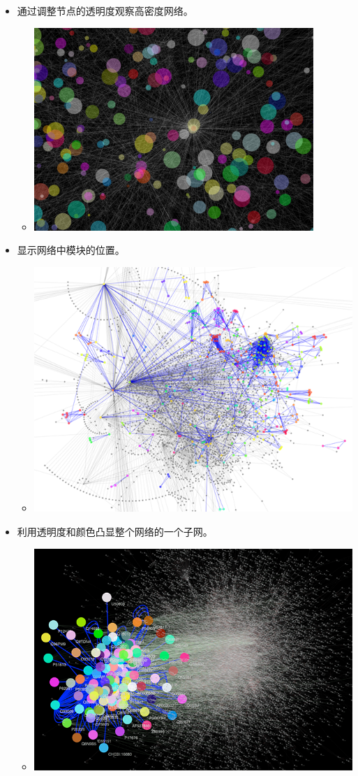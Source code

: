 \begin{itemize}
\item 通过调整节点的透明度观察高密度网络。\begin{itemize}
\item\centerline{
 \includegraphics[width=.6\textwidth]{images/OpacityForNodesAndEdges.png} }
\end{itemize}

\item 显示网络中模块的位置。\begin{itemize}
\item \centerline{
 \includegraphics[width=.6\textwidth]{images/ModuleLocations.png} }
\end{itemize}

\item 利用透明度和颜色凸显整个网络的一个子网。\begin{itemize}
\item \centerline{
 \includegraphics[width=.6\textwidth]{images/Overlay.png} }
\end{itemize}
\end{itemize}

